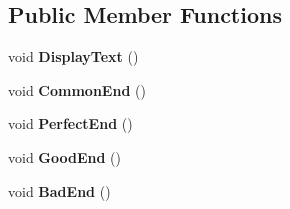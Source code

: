\subsection*{Public Member Functions}
\begin{DoxyCompactItemize}
\item 
void {\bfseries Display\+Text} ()\hypertarget{class_u_i_text_shower_a239b1f78b187e94a417322787fa80fde}{}\label{class_u_i_text_shower_a239b1f78b187e94a417322787fa80fde}

\item 
void {\bfseries Common\+End} ()\hypertarget{class_u_i_text_shower_a4c7be788707d13ceb6d1618ede816e99}{}\label{class_u_i_text_shower_a4c7be788707d13ceb6d1618ede816e99}

\item 
void {\bfseries Perfect\+End} ()\hypertarget{class_u_i_text_shower_aa12ff87b300c09238620d390295c5deb}{}\label{class_u_i_text_shower_aa12ff87b300c09238620d390295c5deb}

\item 
void {\bfseries Good\+End} ()\hypertarget{class_u_i_text_shower_aa9a7c3aa74afd32c031aac71e7d3bac0}{}\label{class_u_i_text_shower_aa9a7c3aa74afd32c031aac71e7d3bac0}

\item 
void {\bfseries Bad\+End} ()\hypertarget{class_u_i_text_shower_a50cdc7d73cc93106f2a1972c325d983e}{}\label{class_u_i_text_shower_a50cdc7d73cc93106f2a1972c325d983e}

\end{DoxyCompactItemize}
